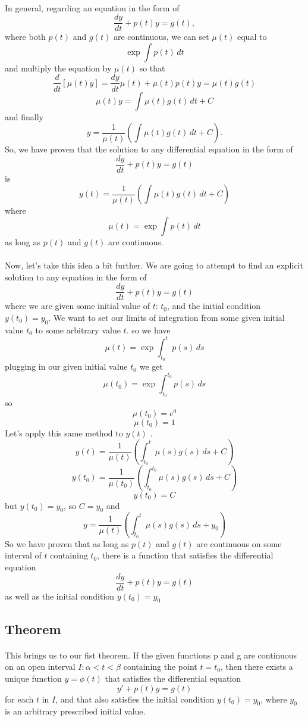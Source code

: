 \documentclass[font =22]{report}
\begin{document}
\paragraph{}
In general, regarding an equation in the form of
\[
\frac{dy}{dt}+p(t)y = g(t),
\]
where both $p(t)$ and $g(t)$ are continuous, we can set $\mu (t) $ equal to 
\[
\exp \int p(t)\,dt 
\]
and multiply the equation by $\mu(t)$ so that 
\[
\frac{d}{dt}[\mu(t)y] = \frac{dy}{dt}\mu(t) + \mu(t)p(t)y = \mu(t)g(t)
\]
\[
\mu(t)y=\int \mu(t)g(t)\,dt+C
\]
and finally 
\[
y = \frac{1}{\mu(t)} \left(\int \mu(t)g(t)\,dt + C\right).
\]
So, we have proven that the solution to any differential equation in the form of 
\[
\frac{dy}{dt} + p(t)y = g(t)
\]
is
\[
y(t) = \frac{1}{\mu(t)}\left(\int \mu(t)g(t)\,dt+C\right)
\]
where 
\[
\mu(t) =\exp \int p(t)\,dt 
\]
as long as $p(t)$ and $g(t)$ are continuous.


\paragraph{}
Now, let's take this idea a bit further. We are going to attempt to find an explicit solution to any equation in the form of 
\[
\frac{dy}{dt} + p(t)y = g(t)
\]
where we are given some initial value of $t$: $t_0$, and the initial condition $y(t_0) = y_0$.
We want to set our limits of integration from some given initial value $t_0$ to some arbitrary value $t$.
so we have
\[
\mu(t) = \exp \int_{t_0}^t p(s)\,ds
\]
plugging in our given initial value $t_0$ we get
\[
\mu(t_0)=\exp \int_{t_0}^{t_0} p(s)\,ds 
\]
so
\[
\mu(t_0) = e^0
\]
\[
\mu(t_0) = 1
\]
Let's apply this same method to $y(t)$ . 
\[
y(t) = \frac{1}{\mu(t)}\left(\int_{t_0}^{t} \mu(s)g(s)\,ds+C\right)
\]
\[
y(t_0) = \frac{1}{\mu(t_0)}\left(\int_{t_0}^{t_0} \mu(s)g(s)\,ds + C \right)
\]
\[
y(t_0) = C
\]
but $y(t_0) = y_0$, so $C = y_0$
and 
\[
y = \frac{1}{\mu(t)}\left(\int_{t_0}^{t} \mu(s)g(s)\,ds + y_0 \right)
\]
So we have proven that as long as $p(t)$ and $g(t)$ are continuous on some interval of $t$ containing $t_0$, there is a function that satisfies the differential equation 
\[
\frac{dy}{dt} + p(t)y = g(t) 
\]
as well as the initial condition $y(t_0) = y_0$


\subsection*{Theorem}
\paragraph{}
This brings us to our fist theorem. If the given functions p and g are continuous on an open interval $I: \alpha<t<\beta$ containing the point $t = t_0$, then there exists a unique function $y = \phi(t)$ that satisfies the differential equation 
\[
y'+p(t)y=g(t)
\]
for each $t$ in $I$, and that also satisfies the initial condition $y(t_0) = y_0$, where $y_0$ is an arbitrary prescribed initial value.
\end{document}
